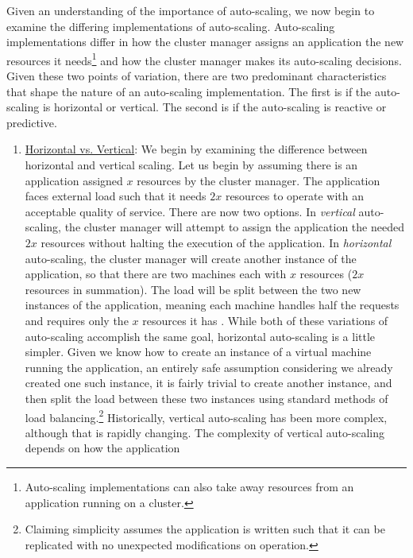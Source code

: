 Given an understanding of the importance of auto-scaling, we now begin to
examine the differing implementations of auto-scaling. Auto-scaling
implementations differ in how the cluster manager
assigns an application the new resources it
needs\footnote{Auto-scaling implementations can also take away resources from
an application running on a cluster.} and how the cluster manager makes its
auto-scaling decisions. Given these two points of
variation, there are two predominant characteristics that shape the nature of an auto-scaling
implementation. The first is if the auto-scaling is horizontal or vertical. The
second is if the auto-scaling is reactive or predictive.

\begin{enumerate}
  \item \underline{Horizontal vs. Vertical}: We begin by examining
    the difference between horizontal and vertical scaling.
    Let us begin by assuming there is an application assigned $x$ resources by the
    cluster manager. The application
    faces external load such that it needs $2x$ resources to operate with an
    acceptable quality of service. There are now two options. In
    \textit{vertical} auto-scaling, the cluster manager will attempt to assign
    the application the needed $2x$ resources
    without halting the execution of the application. In \textit{horizontal}
    auto-scaling, the cluster manager will create another instance of
    the application, so that there are two machines each with
    $x$ resources ($2x$ resources in summation). The load will be split between
    the two new instances of the application, meaning each machine handles half
    the requests and requires only the $x$ resources it has
    \cite{auto-scaling-techniques-for-elastic-applications-in-cloud-environments}. While
    both of these variations of auto-scaling accomplish the same goal, horizontal
    auto-scaling is a little simpler. Given we know how to create an instance of a
    virtual machine running the application, an entirely safe assumption
    considering we already created one such instance, it is fairly trivial to create
    another instance, and then split the load between these two instances using
    standard methods of load balancing.\footnote{Claiming
    simplicity assumes the application is written
    such that it can be replicated with no unexpected modifications
    on operation.} Historically, vertical auto-scaling has been more complex,
    although that is rapidly changing.
    The complexity of vertical auto-scaling depends on how the application

\end{enumerate}
